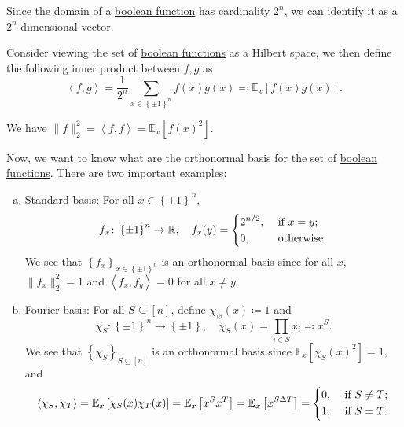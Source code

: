 \begin{note}
	Since the domain of a \hyperref[def:boolean-function]{boolean function} has cardinality \(2^n\), we can identify it as a \(2^n\)-dimensional vector.
\end{note}

Consider viewing the set of \hyperref[def:boolean-function]{boolean functions} as a Hilbert space, we then define the following inner product between \(f, g\) as
\[
	\left\langle f, g \right\rangle
	= \frac{1}{2^n} \sum_{x\in \left\{ \pm 1 \right\} ^n} f(x) g(x)
	\eqqcolon \mathbb{E}_{x}\left[f(x) g(x) \right] .
\]
\begin{note}
	We have \(\lVert f \rVert _2 ^2 = \left\langle f, f \right\rangle = \mathbb{E}_{x}\left[f(x)^2 \right] \).
\end{note}

Now, we want to know what are the orthonormal basis for the set of \hyperref[def:boolean-function]{boolean functions}. There are two important examples:
\begin{enumerate}[(a)]
	\item Standard basis: For all \(x\in \left\{ \pm 1\right\}^n\),
	      \[
		      f_x \colon \left\{ \pm 1 \right\} ^n \to  \mathbb{R} ,\quad
		      f_x (y) = \begin{dcases}
			      2^{n / 2}, & \text{ if } x=y ;   \\
			      0,         & \text{ otherwise} .
		      \end{dcases}
	      \]
	      We see that \(\left\{ f_x \right\} _{x\in \left\{ \pm 1 \right\} ^n}\) is an orthonormal basis since for all \(x\), \(\lVert f_x \rVert _2^2 = 1\) and \(\left\langle f_x, f_y \right\rangle = 0\) for all \(x \neq y\).
	\item Fourier basis: For all \(S \subseteq [n]\), define \(\chi _\varnothing (x) \coloneqq 1\) and
	      \[
		      \chi _S \colon \left\{ \pm 1 \right\} ^n \to  \left\{ \pm 1 \right\} ,\quad
		      \chi _S (x) = \prod_{i\in S} x_i \eqqcolon x^S.
	      \]
	      We see that \(\left\{ \chi _S \right\}_{S \subseteq [n]} \) is an orthonormal basis since \(\mathbb{E}_{x}\left[\chi _S(x)^2 \right] = 1\), and
	      \[
		      \left\langle \chi _S, \chi _T \right\rangle
		      = \mathbb{E}_{x}\left[\chi _S(x) \chi _T(x) \right]
		      = \mathbb{E}_{x}\left[x^S x^T \right]
		      = \mathbb{E}_{x}\left[x^{S \Delta T} \right]
		      = \begin{dcases}
			      0, & \text{ if } S \neq T ; \\
			      1, & \text{ if } S = T .
		      \end{dcases}
	      \]
\end{enumerate}


